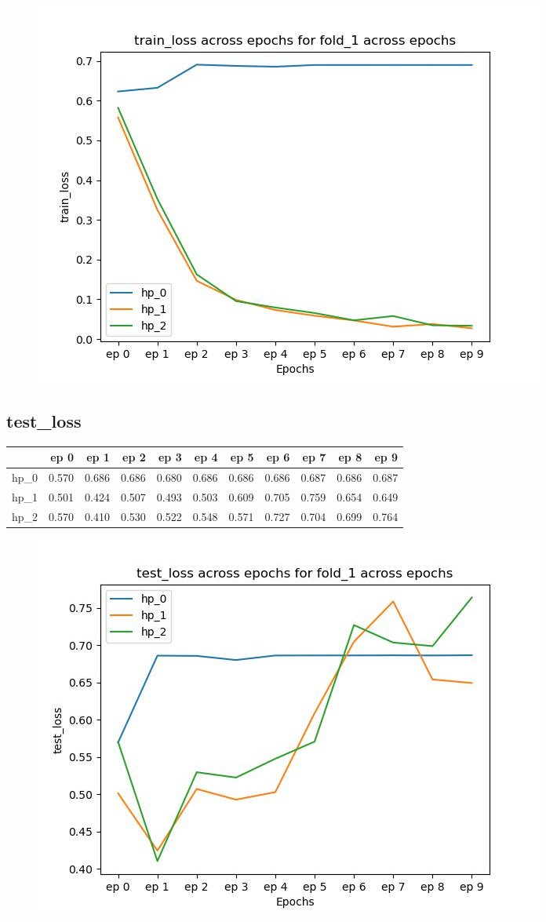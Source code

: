 \documentclass{article}
\begin{document}
\begin{figure}[H]
\includegraphics[scale = 0.75]{fold_1/train_loss}
\end{figure}
\subsection{test\_loss}
\begin{tabular}{lrrrrrrrrrr}
\toprule
{} &   ep 0 &   ep 1 &   ep 2 &   ep 3 &   ep 4 &   ep 5 &   ep 6 &   ep 7 &   ep 8 &   ep 9 \\
\midrule
hp\_0 &  0.570 &  0.686 &  0.686 &  0.680 &  0.686 &  0.686 &  0.686 &  0.687 &  0.686 &  0.687 \\
hp\_1 &  0.501 &  0.424 &  0.507 &  0.493 &  0.503 &  0.609 &  0.705 &  0.759 &  0.654 &  0.649 \\
hp\_2 &  0.570 &  0.410 &  0.530 &  0.522 &  0.548 &  0.571 &  0.727 &  0.704 &  0.699 &  0.764 \\
\bottomrule
\end{tabular}

\begin{figure}[H]
\includegraphics[scale = 0.75]{fold_1/test_loss}
\end{figure}
\end{document}
